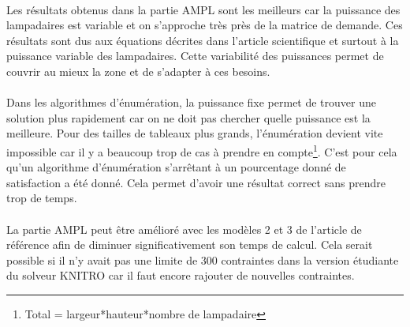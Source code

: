  \paragraph{}
Les résultats obtenus dans la partie AMPL sont les meilleurs car la puissance des lampadaires est variable et on s'approche très près de la matrice de demande. Ces résultats sont dus aux équations décrites dans l'article scientifique et surtout à la puissance variable des lampadaires. Cette variabilité des puissances permet de couvrir au mieux la zone et de s'adapter à ces besoins. 

\paragraph{}
Dans les algorithmes d'énumération, la puissance fixe permet de trouver une solution plus rapidement car on ne doit pas chercher quelle puissance est la meilleure. Pour des tailles de tableaux plus grands, l'énumération devient vite impossible car il y a beaucoup trop de cas à prendre en compte\footnote{Total = largeur*hauteur*nombre de lampadaire}. C'est pour cela qu'un algorithme d'énumération s'arrêtant à un pourcentage donné de satisfaction a été donné. Cela permet d'avoir une résultat correct sans prendre trop de temps.

\paragraph{}
La partie AMPL peut être amélioré avec les modèles 2 et 3 de l'article de référence afin de diminuer significativement son temps de calcul. Cela serait possible si il n'y avait pas une limite de 300 contraintes dans la version étudiante du solveur KNITRO car il faut encore rajouter de nouvelles contraintes.


